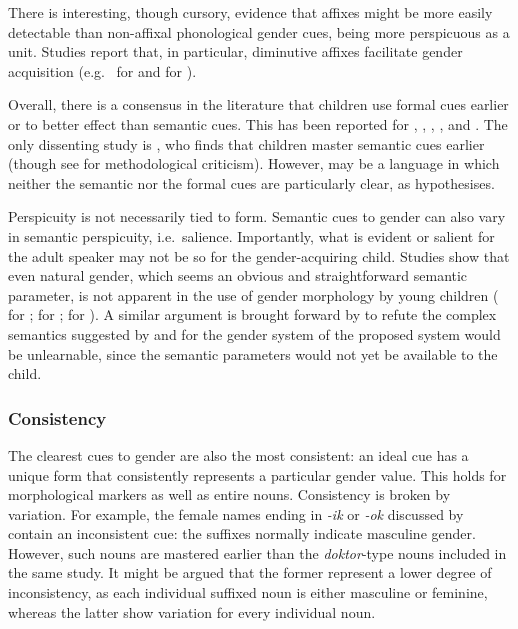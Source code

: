 \documentclass[output=collectionpaper]{langsci/langscibook}
\begin{document}
There is interesting, though cursory, evidence that affixes might be more easily detectable than non-affixal phonological gender cues, being more perspicuous as a unit. Studies report that, in particular, diminutive affixes facilitate gender acquisition (e.g.\ \citealt{Kempe2003} for  and \citealt{Cornips2008} for ).

Overall, there is a consensus in the literature that children use formal cues earlier or to better effect than semantic cues. This has been reported for  \citep{Gagliardi2014},  \citep{Karmiloff-Smith1979},  \citep{PerezPereira1991},  \citep{MacWhinney1978,Mills1986}, and  \citep{Rodina2014,Rodina2012}. The only dissenting study is \citet{Mulford1985}, who finds that  children master semantic cues earlier (though see \citealt{PerezPereira1991} for methodological criticism). However,  may be a language in which neither the semantic nor the formal cues are particularly clear, as \citet{Levy1988} hypothesises.

Perspicuity is not necessarily tied to form. Semantic cues to gender can also vary in semantic perspicuity, i.e.\ salience. Importantly, what is evident or salient for the adult speaker may not be so for the gender-acquiring child. Studies show that even natural gender, which seems an obvious and straightforward semantic parameter, is not apparent in the use of gender morphology by young children (\citealt{Szagun2007} for ; \citealt{Rodina2014} for ; \citealt{Mills1986} for ). A similar argument is brought forward by \citet{Plaster2010} to refute the complex semantics suggested by \citet{Dixon1972} and \citet{Lakoff1987} for the gender system of  \textendash{} the proposed system would be unlearnable, since the semantic parameters would not yet be available to the child.

\subsubsection{Consistency}

The clearest cues to gender are also the most consistent: an ideal cue has a unique form that consistently represents a particular gender value. This holds for morphological markers as well as entire nouns. Consistency is broken by variation. For example, the female names ending in \textit{-ik} or \textit{-ok} discussed by \citet{Rodina2014} contain an inconsistent cue: the suffixes normally indicate masculine gender. However, such nouns are mastered earlier than the \textit{doktor}-type nouns included in the same study. It might be argued that the former represent a lower degree of inconsistency, as each individual suffixed noun is either masculine or feminine, whereas the latter show variation for every individual noun.
\end{document}
